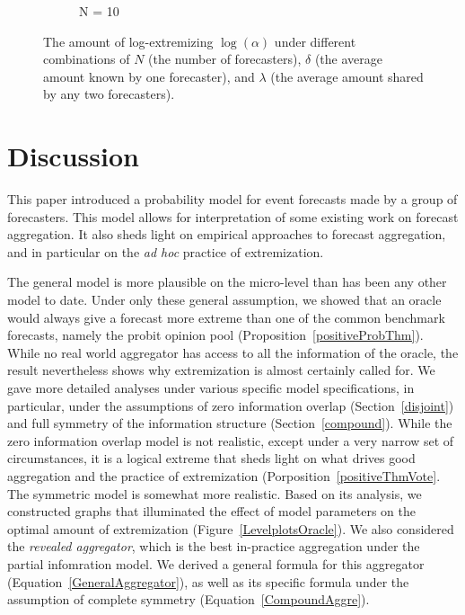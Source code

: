 \documentclass[11pt]{article}
\theoremstyle{definition}
\theoremstyle{definition}
\begin{document}
\begin{figure}[ht!]
\begin{subfigure}[b]{0.499\textwidth}
\caption{N = 10}
\label{ExtremeN10}
    \end{subfigure}
    \caption{ The amount of log-extremizing $\log(\alpha)$ under 
    different combinations of $N$ (the number of forecasters), 
    $\delta$ (the average amount known by one forecaster), and 
    $\lambda$ (the average amount shared by any two forecasters).}
    \label{Levelplots}
\end{figure}
\clearpage

 
\section{Discussion}
\label{discussion}

This paper introduced a probability model for event forecasts made 
by a group of forecasters.  This model allows for interpretation
of some existing work on forecast aggregation.  It also sheds 
light on empirical approaches to forecast aggregation, and in 
particular on the {\em ad hoc} practice of extremization.  

The general model is more plausible on the micro-level than has
been any other model to date.  Under only these general assumption, 
we showed that an oracle would always give a forecast more extreme 
than one of the common benchmark forecasts, namely the probit
opinion pool (Proposition~\ref{positiveProbThm}).  While no 
real world aggregator has access to all the information of the 
oracle, the result nevertheless shows why extremization is almost 
certainly called for.  We gave more detailed analyses under various
specific model specifications, in particular, under the assumptions
of zero information overlap (Section~\ref{disjoint}) and full
symmetry of the information structure (Section~\ref{compound}).
While the zero information overlap model is not realistic, except
under a very narrow set of circumstances, it is a logical extreme
that sheds light on what drives good aggregation and the practice
of extremization (Porposition~\ref{positiveThmVote}.  The symmetric 
model is somewhat more realistic.  Based on its analysis, we 
constructed graphs that illuminated the effect of model parameters 
on the optimal amount of extremization (Figure~\ref{LevelplotsOracle}).
We also considered the {\em revealed aggregator}, which is the
best in-practice aggregation under the partial infomration model.
We derived a general formula for this aggregator 
(Equation~\ref{GeneralAggregator}), as well as its specific formula 
under the assumption of complete symmetry (Equation~\ref{CompoundAggre}).
\end{document}
